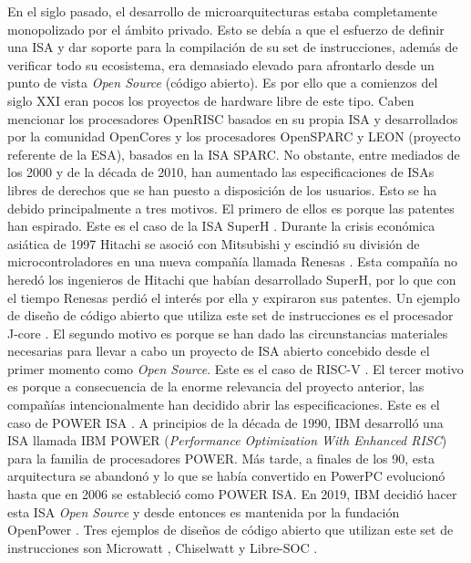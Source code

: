 En el siglo pasado, el desarrollo de microarquitecturas estaba completamente monopolizado por el ámbito privado.
Esto se debía a que el esfuerzo de definir una ISA y dar soporte para la compilación de su set de instrucciones, además de verificar todo su ecosistema, era demasiado elevado para afrontarlo desde un punto de vista \textit{Open Source} (código abierto).
Es por ello que a comienzos del siglo XXI eran pocos los proyectos de hardware libre de este tipo.
Caben mencionar los procesadores OpenRISC \cite{openrisc} basados en su propia ISA y desarrollados por la comunidad OpenCores \cite{opencores} y los procesadores OpenSPARC \cite{opensparc} y LEON \cite{leon} (proyecto referente de la ESA), basados en la ISA SPARC.
No obstante, entre mediados de los 2000 y de la década de 2010, han aumentado las especificaciones de ISAs libres de derechos que se han puesto a disposición de los usuarios.
Esto se ha debido principalmente a tres motivos.
El primero de ellos es porque las patentes han espirado.
Este es el caso de la ISA SuperH \cite{superh}.
Durante la crisis económica asiática de 1997 Hitachi se asoció con Mitsubishi y escindió su división de microcontroladores en una nueva compañía llamada Renesas \cite{new-comp}.
Esta compañía no heredó los ingenieros de Hitachi que habían desarrollado SuperH, por lo que con el tiempo Renesas perdió el interés por ella y expiraron sus patentes.
Un ejemplo de diseño de código abierto que utiliza este set de instrucciones es el procesador J-core \cite{j-core}.
El segundo motivo es porque se han dado las circunstancias materiales necesarias para llevar a cabo un proyecto de ISA abierto concebido desde el primer momento como \textit{Open Source}.
Este es el caso de RISC-V \cite{waterman13}.
El tercer motivo es porque a consecuencia de la enorme relevancia del proyecto anterior, las compañías intencionalmente han decidido abrir las especificaciones. 
Este es el caso de POWER ISA \cite{power}.
A principios de la década de 1990, IBM desarrolló una ISA llamada IBM POWER (\textit{Performance Optimization With Enhanced RISC}) para la familia de procesadores POWER.
Más tarde, a finales de los 90, esta arquitectura se abandonó y lo que se había convertido en PowerPC evolucionó hasta que en 2006 se estableció como POWER ISA. 
En 2019, IBM decidió hacer esta ISA \textit{Open Source} y desde entonces es mantenida por la fundación OpenPower \cite{open-power}.
Tres ejemplos de diseños de código abierto que utilizan este set de instrucciones son Microwatt \cite {gh:microwatt}, Chiselwatt \cite{gh:chiselwatt} y Libre-SOC \cite{libre-soc}.


